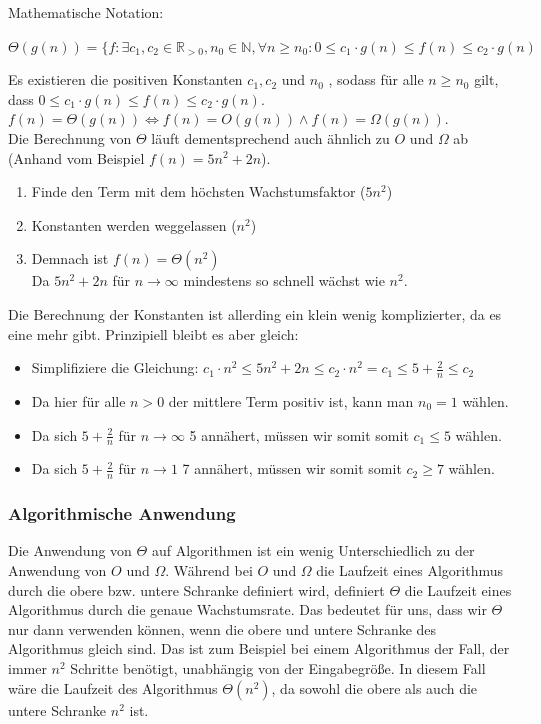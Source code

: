\documentclass[
../AuD-Zusammenfassung.tex,
]
{subfiles}
\begin{document}
Mathematische Notation:
\begin{center}
    $\Theta(g(n)) = \{f: \exists c_1, c_2 \in \mathbb{R}_{>0}, n_0 \in \mathbb{N}, \forall n \geq n_0:  0 \leq c_1 \cdot g(n) \leq f(n) \leq c_2 \cdot g(n)$
\end{center}
Es existieren die positiven Konstanten $c_1, c_2$ und $n_0$ , sodass für alle $n \geq n_0$ gilt, dass  $0 \leq c_1 \cdot g(n) \leq f(n) \leq c_2 \cdot g(n)$. \\
$f(n) = \Theta(g(n)) \Longleftrightarrow f(n) = O(g(n)) \wedge f(n) = \Omega(g(n))$.\\

Die Berechnung von $\Theta$ läuft dementsprechend auch ähnlich zu $O$ und $\Omega$ ab (Anhand vom Beispiel $f(n) = 5n^2 + 2n$). 
\begin{enumerate}
    \item Finde den Term mit dem höchsten Wachstumsfaktor ($5n^2$)
    \item Konstanten werden weggelassen ($n^2$)
    \item Demnach ist $f(n) = \Theta(n^2)$\\
    Da $5n^2 + 2n$ für $n \to \infty$ mindestens so schnell wächst wie $n^2$.
\end{enumerate}
Die Berechnung der Konstanten ist allerding ein klein wenig komplizierter, da es eine mehr gibt. Prinzipiell bleibt es aber gleich:
\begin{itemize}
    \item Simplifiziere die Gleichung: $c_1 \cdot n^2 \leq 5n^2 + 2n \leq c_2 \cdot n^2 = c_1 \leq 5 + \frac{2}{n} \leq c_2$
    \item Da hier für alle $n > 0$ der mittlere Term positiv ist, kann man $n_0 = 1$ wählen. 
    \item Da sich $5 + \frac{2}{n}$ für $n \to \infty$ 5 annähert, müssen wir somit somit $c_1 \leq 5$ wählen.
    \item Da sich $5 + \frac{2}{n}$ für $n \to 1$ 7 annähert, müssen wir somit somit $c_2 \geq 7$ wählen.
\end{itemize}

\subsubsection{Algorithmische Anwendung}
Die Anwendung von $\Theta$ auf Algorithmen ist ein wenig Unterschiedlich zu der Anwendung von $O$ und $\Omega$. Während bei $O$ und $\Omega$ die Laufzeit eines Algorithmus durch die obere bzw. untere Schranke definiert wird, definiert $\Theta$ die Laufzeit eines Algorithmus durch die genaue Wachstumsrate. 
Das bedeutet für uns, dass wir $\Theta$ nur dann verwenden können, wenn die obere und untere Schranke des Algorithmus gleich sind. Das ist zum Beispiel bei einem Algorithmus der Fall, der immer $n^2$ Schritte benötigt, unabhängig von der Eingabegröße. In diesem Fall wäre die Laufzeit des Algorithmus $\Theta(n^2)$, da sowohl die obere als auch die untere Schranke $n^2$ ist.
\end{document}
